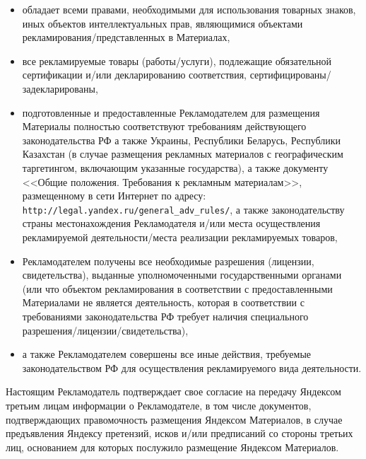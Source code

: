 \begin{itemize}
    \item обладает всеми правами, необходимыми для использования
        товарных знаков, иных объектов интеллектуальных прав, являющимися
        объектами \lb рекламирования/представленных в Материалах,

    \item все рекламируемые товары (работы/услуги), подлежащие обязательной
        сертификации и/или декларированию соответствия,
        сертифицированы/задекларированы,

    \item подготовленные и предоставленные Рекламодателем для размещения
        Материалы полностью соответствуют требованиям действующего
        законодательства РФ а также Украины, Республики Беларусь,
        Республики Казахстан (в случае размещения рекламных материалов
        с географическим таргетингом, включающим указанные государства),
        а также документу <<Общие положения. Требования к рекламным материалам>>,
        размещенному в сети Интернет по адресу: \lb \verb|http://legal.yandex.ru/general_adv_rules/|,
        а также законодательству страны местонахождения Рекламодателя и/или
        места осуществления рекламируемой деятельности/места реализации
        рекламируемых товаров,

    \item Рекламодателем получены все необходимые разрешения (лицензии,
        свидетельства), выданные уполномоченными государственными органами
        (или что объектом рекламирования в соответствии с предоставленными
        Материалами не является деятельность, которая в соответствии с
        требованиями законодательства РФ требует наличия специального
        разрешения/лицензии/свидетельства),

    \item а также Рекламодателем совершены все иные действия, требуемые
        законодательством РФ для осуществления рекламируемого
        вида деятельности.
\end{itemize}

\noindent
    Настоящим Рекламодатель подтверждает свое согласие на передачу
    Яндексом третьим лицам информации о Рекламодателе, в том числе
    документов, подтверждающих правомочность размещения Яндексом
    Материалов, в случае предъявления Яндексу претензий, исков
    и/или предписаний со стороны третьих лиц, основанием для которых
    послужило размещение Яндексом Материалов.
\vspace{0.5em}

